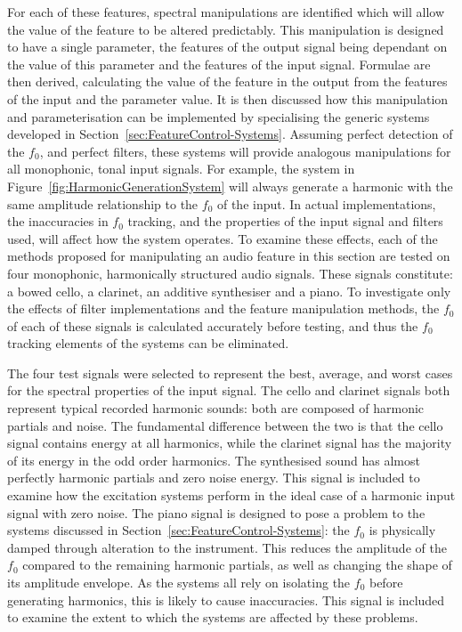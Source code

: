 		For each of these features, spectral manipulations are identified which will allow the value of the feature
		to be altered predictably. This manipulation is designed to have a single parameter, the features of the
		output signal being dependant on the value of this parameter and the features of the input signal.
		Formulae are then derived, calculating the value of the feature in the output from the features of the
		input and the parameter value. It is then discussed how this manipulation and parameterisation can be
		implemented by specialising the generic systems developed in Section~\ref{sec:FeatureControl-Systems}.
		Assuming perfect detection of the $f_{0}$, and perfect filters, these systems will provide analogous
		manipulations for all monophonic, tonal input signals. For example, the system in
		Figure~\ref{fig:HarmonicGenerationSystem} will always generate a harmonic with the same amplitude
		relationship to the $f_{0}$ of the input. In actual implementations, the inaccuracies in $f_{0}$ tracking,
		and the properties of the input signal and filters used, will affect how the system operates. To examine
		these effects, each of the methods proposed for manipulating an audio feature in this section are tested on
		four monophonic, harmonically structured audio signals. These signals constitute: a bowed cello, a
		clarinet, an additive synthesiser and a piano. To investigate only the effects of filter implementations
		and the feature manipulation methods, the $f_{0}$ of each of these signals is calculated accurately before
		testing, and thus the $f_{0}$ tracking elements of the systems can be eliminated.

		The four test signals were selected to represent the best, average, and worst cases for the spectral
		properties of the input signal. The cello and clarinet signals both represent typical recorded harmonic
		sounds: both are composed of harmonic partials and noise. The fundamental difference between the two is
		that the cello signal contains energy at all harmonics, while the clarinet signal has the majority of its
		energy in the odd order harmonics. The synthesised sound has almost perfectly harmonic partials and zero
		noise energy. This signal is included to examine how the excitation systems perform in the ideal case of a
		harmonic input signal with zero noise. The piano signal is designed to pose a problem to the systems
		discussed in Section~\ref{sec:FeatureControl-Systems}: the $f_{0}$ is physically damped through alteration
		to the instrument. This reduces the amplitude of the $f_{0}$ compared to the remaining harmonic partials,
		as well as changing the shape of its amplitude envelope. As the systems all rely on isolating the $f_{0}$
		before generating harmonics, this is likely to cause inaccuracies. This signal is included to examine the
		extent to which the systems are affected by these problems.

